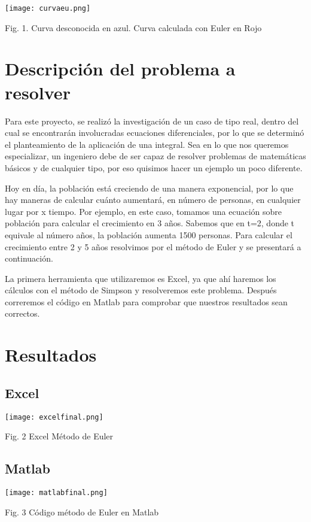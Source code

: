 \documentclass{article}
\begin{document}
\texttt{[image: curvaeu.png]}
\item 
 \caption{Fig. 1. Curva desconocida en azul.
 Curva calculada con Euler en Rojo}
    \label{fig:my_label} 



\section{Descripción del problema a resolver}
\item Para este proyecto, se realizó la investigación de un caso de tipo real, dentro del cual se encontrarán involucradas ecuaciones diferenciales, por lo que se determinó el planteamiento de la aplicación de una integral. Sea en lo que nos queremos especializar, un ingeniero debe de ser capaz de resolver problemas de matemáticas básicos y de cualquier tipo, por eso quisimos hacer un ejemplo un poco diferente. 

Hoy en día, la población está creciendo de una manera exponencial, por lo que hay maneras de calcular cuánto aumentará, en número de personas, en cualquier lugar por x tiempo. Por ejemplo, en este caso, tomamos una ecuación sobre población para calcular el crecimiento en 3 años. Sabemos que en t=2, donde t equivale al número años, la población aumenta 1500 personas. Para calcular el crecimiento entre 2 y 5 años resolvimos por el método de Euler y se presentará a continuación. 
 
La primera herramienta que utilizaremos es Excel, ya que ahí haremos los cálculos con el método de Simpson y resolveremos este problema. Después correremos el código en Matlab para comprobar que nuestros resultados sean correctos. 

\section{Resultados}


\subsection{Excel}

 \texttt{[image: excelfinal.png]}
    \caption{Fig. 2 Excel Método de Euler}
    \label{fig:my_label}
    

\subsection{Matlab}
    \texttt{[image: matlabfinal.png]}
    \item
    \caption{Fig. 3 Código método de Euler en Matlab}
    \label{fig:my_label}
    
\end{document}

